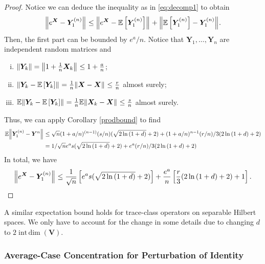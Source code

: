 \begin{proof}
    Notice we can deduce the inequality as in \ref{eq:decomp1} to obtain
\[ \norm{e^{\bm{X}}- \bm{Y}_1^{(n)}}_{} \leq \norm{e^{\bm{X}}- \mathbb{E}\left[\bm{Y}_1^{(n)}\right]}_{} + \norm{\mathbb{E}\left[\bm{Y}_1^{(n)}\right]- \bm{Y}_1^{(n)}}_{} .\]
Then, the first part can be bounded by \( e^{a}/n \). Notice that \( \bm{Y}_1, \dots, \bm{Y}_n \) are independent random matrices and 
        \begin{enumerate}[i)]
        \item \(\norm{\bm{Y}_k} = \norm{1+\frac{1}{n}\bm{X}_k}_{} \leq 1+ \frac{a}{n} \);
        \item \( \norm{\bm{Y}_k- \mathbb{E}\left[\bm{Y}_k\right]}_{} = \frac{1}{n} \norm{\bm{X}-\bm{X}}_{} \leq \frac{r}{n}\) almost surely;
        \item \( \mathbb{E} \norm{\bm{Y}_k- \mathbb{E}\left[\bm{Y}_k\right]}_{} = \frac{1}{n} \mathbb{E} \norm{\bm{X}_k-\bm{X}}_{} \leq \frac{s}{n} \) almost surely.
        \end{enumerate}
 Thus, we can apply Corollary \ref{prodbound} to find 
\begin{align*}
  \mathbb{E} \norm{ \bm{Y}_1^{(n)} - \bm{Y}^{n}}_{} &\leq \sqrt{n}(1+a/n)^{(n-1)}(s/n) (\sqrt{2 \operatorname{ln}\left(1+d\right)}+2) + (1+a/n)^{n-1}(r/n)/3 (2 \operatorname{ln}\left(1+d\right)+2) \\
     & = 1/\sqrt{n}e^{a}s (\sqrt{2 \operatorname{ln}\left(1+d\right)}+2) + e^{a}(r/n)/3 (2 \operatorname{ln}\left(1+d\right)+2) \
\end{align*} 
In total, we have 
\[ \norm{e^{\bm{X}}- \bm{Y}_1^{(n)}}_{} \leq    \frac{1}{\sqrt{n}} \left[e^{a}s (\sqrt{2 \operatorname{ln}\left(1+d\right)}+2)\right] +  \frac{e^{a}}{n} \left[ \frac{r}{3} (2 \operatorname{ln}\left(1+d\right)+2)+ 1 \right] .\]
\end{proof}

A similar expectation bound holds for trace-class operators on separable Hilbert spaces. We only have to account for the change in some details due to changing \( d \) to \( 2 \operatorname{int\, dim}\left(\bm{V}\right) \). 
\subsubsection{Average-Case Concentration for Perturbation of Identity}

